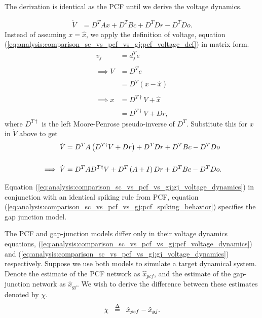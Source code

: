 \begin{enumerate}
\begin{itemize}
The derivation is identical as the PCF until we derive the voltage dynamics.

\begin{align*}
\dot{V} &= 
D^T A x
+
D^T B c
+ D^T D r
- D^T D o.
\end{align*}
Instead of assuming $x = \hat{x}$, we apply the definition of voltage, equation (\ref{eq:analysis:comparison_sc_vs_pcf_vs_gj:pcf_voltage_def}) in matrix form.
\begin{align*}
v_j &= d_j^T e 
%
\\
\\
%
\implies 
V &= D^T e
%
\\
\\
%
&= 
D^T 
\left(
x - \hat{x}
\right)
%
\\
\\
%
\implies
x 
&=
D^{T \dagger} V  + \hat{x}
%
\\
\\
%
&=
D^{T \dagger} V + D r,
\end{align*}
where $D^{T \dagger}$ is the left Moore-Penrose pseudo-inverse of $D^T$.
Substitute this for $x$ in $\dot{V}$ above to get
\begin{align}
\label{eq:analysis:comparison_sc_vs_pcf_vs_gj:gj_voltage_dynamics}
\dot{V} &= 
D^T A
\left(
	D^{T \dagger} V + D r
\right)
+ D^T D r
+
D^T B c
- D^T D o 
\notag
% 
\\ \notag
\\ 
%
\implies
\dot{V}
&= 
D^T A
D^{T \dagger} V 
+
D^T
\left(
	A + I 
\right)
D r
+ 
D^T B c
- D^T D o.
\end{align}

Equation (\ref{eq:analysis:comparison_sc_vs_pcf_vs_gj:gj_voltage_dynamics}) in conjunction with an identical spiking rule from PCF, equation (\ref{eq:analysis:comparison_sc_vs_pcf_vs_gj:pcf_spiking_behavior}) specifies the gap junction model.
\clearpage

The PCF and gap-junction models differ only in their voltage dynamics equations, (\ref{eq:analysis:comparison_sc_vs_pcf_vs_gj:pcf_voltage_dynamics}) and (\ref{eq:analysis:comparison_sc_vs_pcf_vs_gj:gj_voltage_dynamics}) respectively. Suppose we use both models to simulate a target dynamical system. Denote the estimate of the PCF network as $\hat{x}_{pcf}$, and the estimate of the gap-junction network as $\hat{x}_{gj}$. We wish to derive the difference between these estimates denoted by $\chi$. 
\begin{align}
	\label{eq:analysis:comparison_sc_vs_pcf_vs_gj:pcf_vs_gj_estimation_error_def}
	\chi \hspace{2mm} \overset{\Delta}{=} \hspace{2mm} \hat{x}_{pcf} - \hat{x}_{gj}.
\end{align}


\end{itemize}
\end{enumerate}
